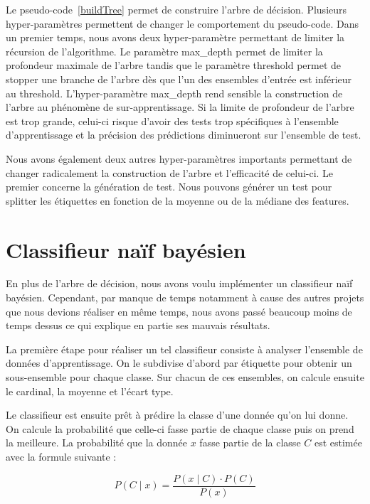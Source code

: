 \documentclass[french, 14pt]{memoir}
\begin{document}
Le pseudo-code~\ref{buildTree} permet de construire l'arbre de décision. Plusieurs hyper-paramètres permettent de changer le comportement du pseudo-code. Dans un premier temps, nous avons deux hyper-paramètre permettant de limiter la récursion de l'algorithme. Le paramètre max\_depth permet de limiter la profondeur maximale de l'arbre tandis que le paramètre threshold permet de stopper une branche de l'arbre dès que l'un des ensembles d'entrée est inférieur au threshold. L'hyper-paramètre max\_depth rend sensible la construction de l'arbre au phénomène de sur-apprentissage. Si la limite de profondeur de l'arbre est trop grande, celui-ci risque d'avoir des tests trop spécifiques à l'ensemble d'apprentissage et la précision des prédictions diminueront sur l'ensemble de test.

Nous avons également deux autres hyper-paramètres importants permettant de changer radicalement la construction de l'arbre et l'efficacité de celui-ci. Le premier concerne la génération de test. Nous pouvons générer un test pour splitter les étiquettes en fonction de la moyenne ou de la médiane des features. 


\section{Classifieur naïf bayésien}

En plus de l'arbre de décision, nous avons voulu implémenter un classifieur naïf bayésien. Cependant, par manque de temps notamment à cause des autres projets que nous devions réaliser en même temps, nous avons passé beaucoup moins de temps dessus ce qui explique en partie ses mauvais résultats.

La première étape pour réaliser un tel classifieur consiste à analyser l'ensemble de données d'apprentissage. On le subdivise d'abord par étiquette pour obtenir un sous-ensemble pour chaque classe. Sur chacun de ces ensembles, on calcule ensuite le cardinal, la moyenne et l'écart type.

Le classifieur est ensuite prêt à prédire la classe d'une donnée qu'on lui donne. On calcule la probabilité que celle-ci fasse partie de chaque classe puis on prend la meilleure. La probabilité que la donnée $x$ fasse partie de la classe $C$ est estimée avec la formule suivante :

\begin{equation}
P(C \mid x) = \frac{P(x \mid C) \cdot P(C)}{P(x)}
\end{equation}
\end{document}
